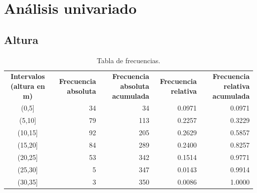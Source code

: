\documentclass[11pt]{article}
\begin{document}

\newpage
\section{Análisis univariado}

\subsection{Altura}

\begin{table}[h!]
  \begin{center}
    \begin{tabular}{| c | r | r | r | r |}
      \hline
      \multirow{3}{3cm}{\centering\textbf{Intervalos (altura en m)}} & 
      \multirow{3}{2.5cm}{\centering\textbf{Frecuencia absoluta}} & 
      \multirow{3}{2.5cm}{\centering\textbf{Frecuencia absoluta acumulada}} &
      \multirow{3}{2.5cm}{\centering\textbf{Frecuencia relativa}} & 
      \multirow{3}{2.5cm}{\centering\textbf{Frecuencia relativa acumulada}} \\
      & & & & \\
      & & & & \\ \hline
      (0,5] & 34 & 34 & 0.0971 & 0.0971 \\ \hline
      (5,10] & 79 & 113 & 0.2257 & 0.3229 \\ \hline
      (10,15] & 92 & 205 & 0.2629 & 0.5857 \\ \hline
      (15,20] & 84 & 289 & 0.2400 & 0.8257 \\ \hline
      (20,25] & 53 & 342 & 0.1514 & 0.9771 \\ \hline
      (25,30] & 5 & 347 & 0.0143 & 0.9914 \\ \hline
      (30,35] & 3 & 350 & 0.0086 & 1.0000 \\ \hline
    \end{tabular}
    \caption{Tabla de frecuencias.}
    \label{tab:tablaAltura}
  \end{center}
\end{table}
\end{document}
